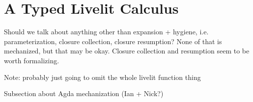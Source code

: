 \section{A Typed Livelit Calculus}\label{sec:livelit-calculus}
Should we talk about anything other than expansion + hygiene, i.e. parameterization, closure collection, closure resumption?
None of that is mechanized, but that may be okay. Closure collection and resumption seem to be worth formalizing.

Note: probably just going to omit the whole livelit function thing

Subsection about Agda mechanization (Ian + Nick?)